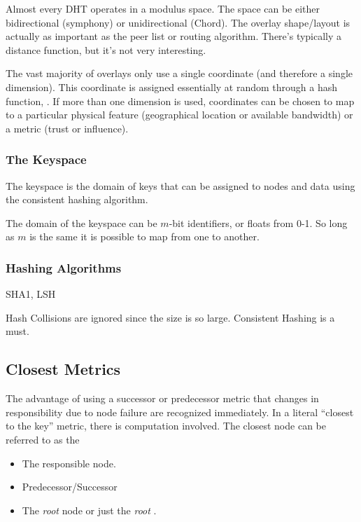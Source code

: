 \documentclass[10pt,letterpaper]{report}
\begin{document}
Almost every DHT operates in a modulus space.  The space can be either bidirectional (symphony) or unidirectional (Chord).
The overlay shape/layout is actually as important as the peer list or routing algorithm.
There's typically a distance function, but it's not very interesting.

The vast majority of overlays only use a single coordinate (and therefore a single dimension).  
This coordinate is assigned essentially at random through a hash function, .  
If more than one dimension is used, coordinates can be chosen to map to a particular physical feature (geographical location  or available bandwidth) or a metric (trust or influence).

\subsubsection{The Keyspace}
The keyspace is the domain of keys that can be assigned to nodes and data using the  consistent hashing algorithm.  

The domain of the keyspace can be $m$-bit identifiers, or floats from 0-1.  So long as $m$ is the same it is possible to map from one to another.

\subsubsection{Hashing Algorithms}
SHA1, LSH

Hash Collisions are ignored since the size is so large.
Consistent Hashing is a must.

\subsection{Closest Metrics}

The advantage of using a successor or predecessor metric that changes in responsibility due to node failure are recognized immediately.  
In a literal ``closest to the key'' metric, there is computation involved. The closest node can be referred to as the 

\begin{itemize}
	\item The responsible node.
	\item Predecessor/Successor \cite{chord}
	\item The \textit{root} node or just the \textit{root} \cite{tapestry}.

\end{itemize}
\end{document}
